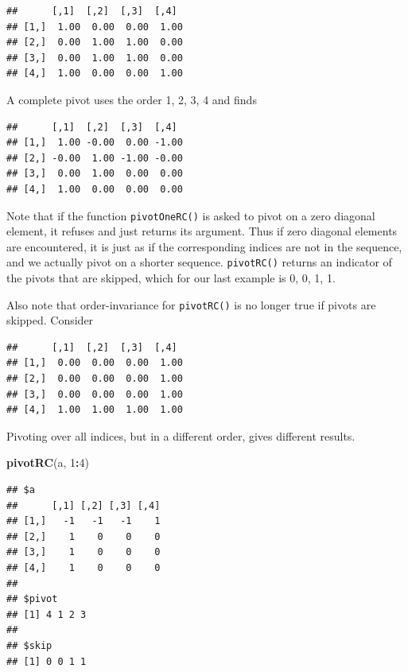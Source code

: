 \documentclass[12pt,]{article}
\newenvironment{Shaded}{\begin{snugshade}}{\end{snugshade}}
\newcommand{\KeywordTok}[1]{\textcolor[rgb]{0.13,0.29,0.53}{\textbf{#1}}}
\newcommand{\DecValTok}[1]{\textcolor[rgb]{0.00,0.00,0.81}{#1}}
\newcommand{\OperatorTok}[1]{\textcolor[rgb]{0.81,0.36,0.00}{\textbf{#1}}}
\newcommand{\NormalTok}[1]{#1}
\begin{document}
\begin{verbatim}
##      [,1]  [,2]  [,3]  [,4] 
## [1,]  1.00  0.00  0.00  1.00
## [2,]  0.00  1.00  1.00  0.00
## [3,]  0.00  1.00  1.00  0.00
## [4,]  1.00  0.00  0.00  1.00
\end{verbatim}

A complete pivot uses the order 1, 2, 3, 4 and finds

\begin{Shaded}
\end{Shaded}

\begin{verbatim}
##      [,1]  [,2]  [,3]  [,4] 
## [1,]  1.00 -0.00  0.00 -1.00
## [2,] -0.00  1.00 -1.00 -0.00
## [3,]  0.00  1.00  0.00  0.00
## [4,]  1.00  0.00  0.00  0.00
\end{verbatim}

Note that if the function \texttt{pivotOneRC()} is asked to pivot on a
zero diagonal element, it refuses and just returns its argument. Thus if
zero diagonal elements are encountered, it is just as if the
corresponding indices are not in the sequence, and we actually pivot on
a shorter sequence. \texttt{pivotRC()} returns an indicator of the
pivots that are skipped, which for our last example is 0, 0, 1, 1.

Also note that order-invariance for \texttt{pivotRC()} is no longer true
if pivots are skipped. Consider

\begin{verbatim}
##      [,1]  [,2]  [,3]  [,4] 
## [1,]  0.00  0.00  0.00  1.00
## [2,]  0.00  0.00  0.00  1.00
## [3,]  0.00  0.00  0.00  1.00
## [4,]  1.00  1.00  1.00  1.00
\end{verbatim}

Pivoting over all indices, but in a different order, gives different
results.

\begin{Shaded}
\begin{Highlighting}[]
\KeywordTok{pivotRC}\NormalTok{(a, }\DecValTok{1}\OperatorTok{:}\DecValTok{4}\NormalTok{)}
\end{Highlighting}
\end{Shaded}

\begin{verbatim}
## $a
##      [,1] [,2] [,3] [,4]
## [1,]   -1   -1   -1    1
## [2,]    1    0    0    0
## [3,]    1    0    0    0
## [4,]    1    0    0    0
## 
## $pivot
## [1] 4 1 2 3
## 
## $skip
## [1] 0 0 1 1
\end{verbatim}
\end{document}

